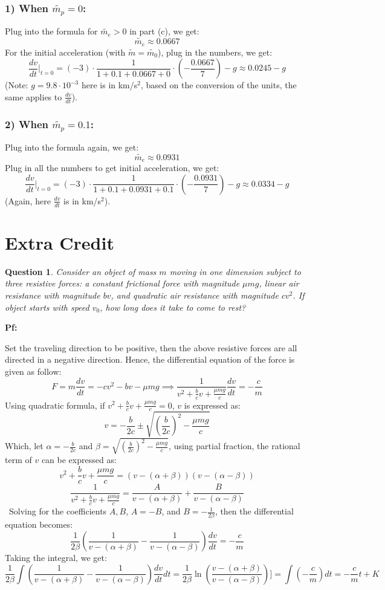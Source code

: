 \documentclass{article}
\newtheorem{question}{Question}
\begin{document}
\subsubsection*{1) When $\tilde{m_p}=0$:}
Plug into the formula for $\tilde{m_e}>0$ in part (c), we get:
$$\tilde{m_e} \approx 0.0667 $$
For the initial acceleration (with $\tilde{m} = \tilde{m_0}$), plug in the numbers, we get:
$$\frac{dv}{dt}\bigg|_{t=0} = (-3)\cdot\frac{1}{1+0.1+0.0667+0}\cdot\left(-\frac{0.0667}{7}\right)-g \approx 0.0245-g$$
(Note: $g=9.8\cdot 10^{-3}$ here is in km/s$^2$, based on the conversion of the units, the same applies to $\frac{dv}{dt}$).

\subsubsection*{2) When $\tilde{m_p}=0.1$:}
Plug into the formula again, we get:
$$\tilde{m_e} \approx 0.0931$$
Plug in all the numbers to get initial acceleration, we get:
$$\frac{dv}{dt}\bigg|_{t=0} = (-3)\cdot\frac{1}{1+0.1+0.0931+0.1}\cdot\left(-\frac{0.0931}{7}\right)-g \approx 0.0334-g$$
(Again, here $\frac{dv}{dt}$ is in km/s$^2$).


\break

\section{Extra Credit}%
\begin{question}\label{q6}
    Consider an object of mass $m$ moving in one dimension subject to three resistive forces: a constant frictional force with magnitude $\mu mg$, linear air resistance with magnitude $bv$, and quadratic air resistance with magnitude $cv^2$. If object starts with speed $v_0$, how long does it take to come to rest?
\end{question}

\textbf{Pf:}

Set the traveling direction to be positive, then the above resistive forces are all directed in a negative direction. Hence, the differential equation of the force is given as follow:
$$F = m\frac{dv}{dt} = - cv^2- bv-\mu mg  \implies \frac{1}{v^2+\frac{b}{c}v+\frac{\mu mg}{c}}\frac{dv}{dt}=-\frac{c}{m}$$
Using quadratic formula, if $v^2+\frac{b}{c}v+\frac{\mu mg}{c}=0$, $v$ is expressed as:
$$v=-\frac{b}{2c}\pm\sqrt{\left(\frac{b}{2c}\right)^2-\frac{\mu mg}{c}}$$
Which, let $\alpha=-\frac{b}{2c}$ and $\beta = \sqrt{(\frac{b}{2c})^2-\frac{\mu mg}{c}}$, using partial fraction, the rational term of $v$ can be expressed as:
$$v^2+\frac{b}{c}v+\frac{\mu mg}{c} = (v-(\alpha+\beta))(v-(\alpha-\beta))$$
$$\frac{1}{v^2+\frac{b}{c}v+\frac{\mu mg}{c}}=\frac{A}{v-(\alpha+\beta)}+\frac{B}{v-(\alpha-\beta)}$$\
Solving for the coefficients $A,B$, $A=-B$, and $B=-\frac{1}{2\beta}$, then the differential equation becomes:
$$\frac{1}{2\beta}\left(\frac{1}{v-(\alpha+\beta)}-\frac{1}{v-(\alpha-\beta)}\right)\frac{dv}{dt}=-\frac{c}{m}$$
Taking the integral, we get:
$$\frac{1}{2\beta}\int\left(\frac{1}{v-(\alpha+\beta)}-\frac{1}{v-(\alpha-\beta)}\right)\frac{dv}{dt}dt = \frac{1}{2\beta}\ln\left(\frac{v-(\alpha+\beta)}{v-(\alpha-\beta)}\right)]= \int\left(-\frac{c}{m}\right)dt = -\frac{c}{m}t+K$$
\end{document}

